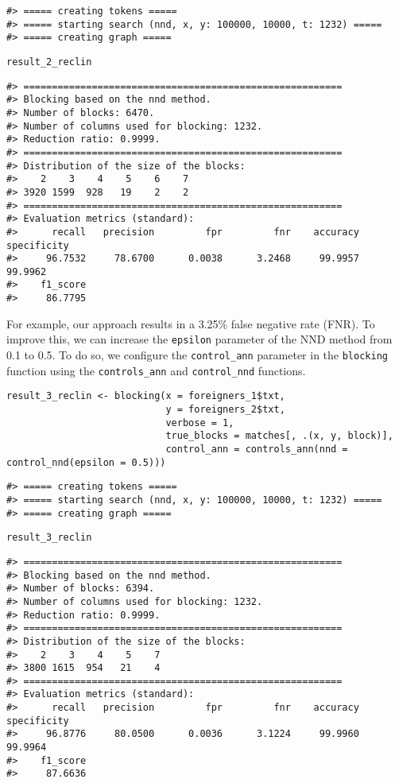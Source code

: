 \begin{verbatim}
#> ===== creating tokens =====
#> ===== starting search (nnd, x, y: 100000, 10000, t: 1232) =====
#> ===== creating graph =====
\end{verbatim}

\begin{verbatim}
result_2_reclin
\end{verbatim}

\begin{verbatim}
#> ========================================================
#> Blocking based on the nnd method.
#> Number of blocks: 6470.
#> Number of columns used for blocking: 1232.
#> Reduction ratio: 0.9999.
#> ========================================================
#> Distribution of the size of the blocks:
#>    2    3    4    5    6    7 
#> 3920 1599  928   19    2    2 
#> ========================================================
#> Evaluation metrics (standard):
#>      recall   precision         fpr         fnr    accuracy specificity 
#>     96.7532     78.6700      0.0038      3.2468     99.9957     99.9962 
#>    f1_score 
#>     86.7795
\end{verbatim}

For example, our approach results in a
3.25\% false negative
rate (FNR). To improve this, we can increase the \texttt{epsilon} parameter of
the NND method from 0.1 to 0.5. To do so, we configure the \texttt{control\_ann}
parameter in the \texttt{blocking} function using the \texttt{controls\_ann} and
\texttt{control\_nnd} functions.

\begin{verbatim}
result_3_reclin <- blocking(x = foreigners_1$txt,
                            y = foreigners_2$txt,
                            verbose = 1,
                            true_blocks = matches[, .(x, y, block)],
                            control_ann = controls_ann(nnd = control_nnd(epsilon = 0.5)))
\end{verbatim}

\begin{verbatim}
#> ===== creating tokens =====
#> ===== starting search (nnd, x, y: 100000, 10000, t: 1232) =====
#> ===== creating graph =====
\end{verbatim}

\begin{verbatim}
result_3_reclin
\end{verbatim}

\begin{verbatim}
#> ========================================================
#> Blocking based on the nnd method.
#> Number of blocks: 6394.
#> Number of columns used for blocking: 1232.
#> Reduction ratio: 0.9999.
#> ========================================================
#> Distribution of the size of the blocks:
#>    2    3    4    5    7 
#> 3800 1615  954   21    4 
#> ========================================================
#> Evaluation metrics (standard):
#>      recall   precision         fpr         fnr    accuracy specificity 
#>     96.8776     80.0500      0.0036      3.1224     99.9960     99.9964 
#>    f1_score 
#>     87.6636
\end{verbatim}

